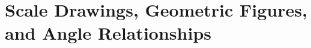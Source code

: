 \documentclass[12pt, fleqn, openany, oneside]{studyGuide}
\begin{document}

\chapter{Scale Drawings, Geometric Figures, and Angle Relationships}








\printAnswerKey
\end{document}
